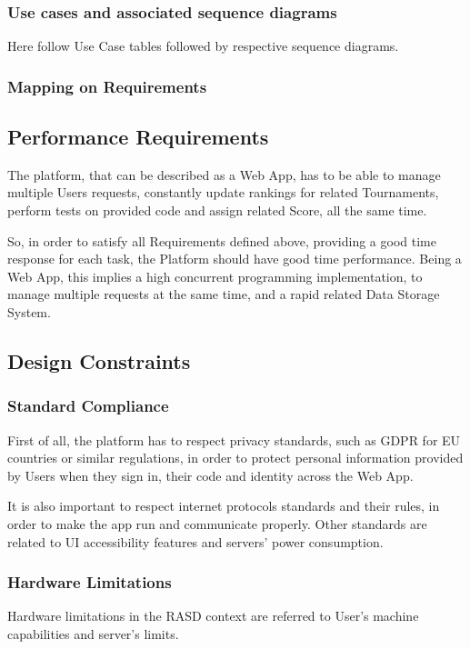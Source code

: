\subsubsection{Use cases and associated sequence diagrams}
Here follow Use Case tables followed by respective sequence diagrams.


\subsubsection{Mapping on Requirements}

\subsection{Performance Requirements}
The platform, that can be described as a Web App, has to be able to manage multiple Users requests, constantly update rankings for related Tournaments, perform tests on provided code and assign related Score, all the same time. 

So, in order to satisfy all Requirements defined above, providing a good time response for each task, the Platform should have good time performance. Being a Web App, this implies a high concurrent programming implementation, to 
manage multiple requests at the same time, and a rapid related Data Storage System. 

\subsection{Design Constraints}

\subsubsection{Standard Compliance}
First of all, the platform has to respect privacy standards, such as GDPR for EU countries or similar regulations, in order to protect personal information provided by Users when they sign in, their code and identity across the Web App.

It is also important to respect internet protocols standards and their rules, in order to make the app run and communicate properly. Other standards are related to UI accessibility features and servers' power consumption. 

\subsubsection{Hardware Limitations}
Hardware limitations in the RASD context are referred to User's machine capabilities and server's limits. 

